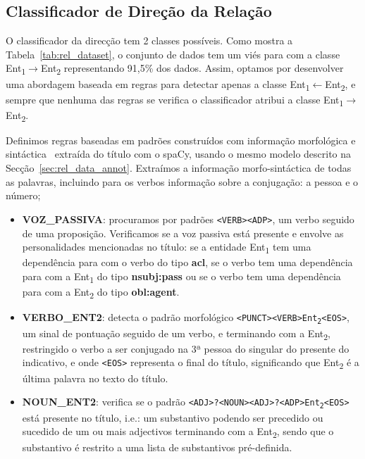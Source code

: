 \documentclass[a4paper, twocolumn, 11pt, twoside]{article}
\begin{document}
\subsection{Classificador de Direção da Relação}
\label{subsec:rel_direction}

O classificador da direcção tem 2 classes possíveis. Como mostra a Tabela~\ref{tab:rel_dataset}, o conjunto de dados tem um viés para com a classe Ent\textsubscript{1}$\rightarrow$Ent\textsubscript{2} representando 91,5\% dos dados. Assim, optamos por desenvolver uma abordagem baseada em regras para detectar apenas a classe Ent\textsubscript{1}$\leftarrow$Ent\textsubscript{2}, e sempre que nenhuma das regras se verifica o classificador atribui a classe Ent\textsubscript{1}$\rightarrow$Ent\textsubscript{2}.

Definimos regras baseadas em padrões construídos com informação morfológica e sintáctica~\citep{nivre-etal-2020-universal} extraída do título com o spaCy, usando o mesmo modelo descrito na Secção~\ref{sec:rel_data_annot}. Extraímos a informação morfo-sintáctica de todas as palavras, incluindo para os verbos informação sobre a conjugação: a pessoa e o número;

\begin{itemize}

\item \textbf{VOZ\_PASSIVA}: procuramos por padrões \texttt{<VERB><ADP>}, um verbo seguido de uma proposição. Verificamos se a voz passiva está presente e envolve as personalidades mencionadas no título: se a entidade Ent\textsubscript{1} tem uma dependência para com o verbo do tipo \textbf{acl}, se o verbo tem uma dependência para com a Ent\textsubscript{1} do tipo \textbf{nsubj:pass} ou se o verbo tem uma dependência para com a Ent\textsubscript{2} do tipo \textbf{obl:agent}. 

\item \textbf{VERBO\_ENT2}: detecta o padrão morfológico \texttt{<PUNCT><VERB>Ent\textsubscript{2}<EOS>}, um sinal de pontuação seguido de um verbo, e terminando com a Ent\textsubscript{2}, restringido o verbo a ser conjugado na 3ª pessoa do singular do presente do indicativo, e onde \texttt{<EOS>} representa o final do título, significando que Ent\textsubscript{2} é a última palavra no texto do título.

\item \textbf{NOUN\_ENT2}: verifica se o padrão \texttt{<ADJ>?<NOUN><ADJ>?<ADP>Ent\textsubscript{2}<EOS>} está presente no título, i.e.: um substantivo podendo ser precedido ou sucedido de um ou mais adjectivos terminando com a Ent\textsubscript{2}, sendo que o substantivo é restrito a uma lista de substantivos pré-definida.
\end{itemize}
\end{document}
